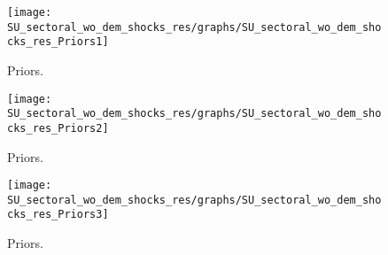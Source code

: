  
\begin{figure}[H]
\centering
\texttt{[image: SU\_sectoral\_wo\_dem\_shocks\_res/graphs/SU\_sectoral\_wo\_dem\_shocks\_res\_Priors1]}
\caption{Priors.}\label{Fig:Priors:1}
\end{figure}
\begin{figure}[H]
\centering
\texttt{[image: SU\_sectoral\_wo\_dem\_shocks\_res/graphs/SU\_sectoral\_wo\_dem\_shocks\_res\_Priors2]}
\caption{Priors.}\label{Fig:Priors:2}
\end{figure}
\begin{figure}[H]
\centering
\texttt{[image: SU\_sectoral\_wo\_dem\_shocks\_res/graphs/SU\_sectoral\_wo\_dem\_shocks\_res\_Priors3]}
\caption{Priors.}\label{Fig:Priors:3}
\end{figure}
 
